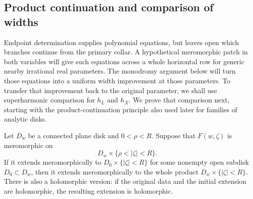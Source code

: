 \subsection{Product continuation and comparison of widths}

Endpoint determination supplies polynomial equations, but leaves open
which branches continue from the primary collar. A hypothetical
meromorphic patch in both variables will give such equations across
a whole horizontal row for generic nearby irrational real parameters.
The monodromy argument below will turn those equations into a uniform
width improvement at those parameters. To transfer that improvement
back to the original parameter, we shall use
superharmonic comparison for \(h_L\) and \(h_X\). We prove that
comparison next, starting with the product-continuation principle
also used later for families of analytic disks.

\begin{lemma}
\label{lem:meromorphic-hartogs}
Let \(D_w\) be a connected plane disk and \(0<\rho<R\).  Suppose that
\(F(w,\zeta)\) is meromorphic on
\[
 D_w\times\{\rho<|\zeta|<R\}.
 \]
If it extends meromorphically to
\(D_0\times\{|\zeta|<R\}\) for some nonempty open subdisk
\(D_0\subset D_w\), then it extends meromorphically to the whole
product \(D_w\times\{|\zeta|<R\}\).
There is also a holomorphic version: if the original data and the
initial extension are holomorphic, the resulting extension is
holomorphic.
\end{lemma}

